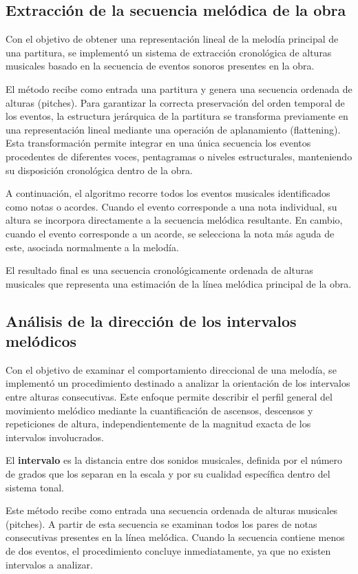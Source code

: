 \subsection{Extracción de la secuencia melódica de la obra}
Con el objetivo de obtener una representación lineal de la melodía principal de una partitura, se implementó un sistema de extracción cronológica de alturas musicales basado en la secuencia de eventos sonoros presentes en la obra.

El método recibe como entrada una partitura y genera una secuencia ordenada de alturas (pitches). Para garantizar la correcta preservación del orden temporal de los eventos, la estructura jerárquica de la partitura se transforma previamente en una representación lineal mediante una operación de aplanamiento (flattening). Esta transformación permite integrar en una única secuencia los eventos procedentes de diferentes voces, pentagramas o niveles estructurales, manteniendo su disposición cronológica dentro de la obra.

A continuación, el algoritmo recorre todos los eventos musicales identificados como notas o acordes. Cuando el evento corresponde a una nota individual, su altura se incorpora directamente a la secuencia melódica resultante. En cambio, cuando el evento corresponde a un acorde, se selecciona la nota más aguda de este, asociada normalmente a la melodía.

El resultado final es una secuencia cronológicamente ordenada de alturas musicales que representa una estimación de la línea melódica principal de la obra.

\subsection{Análisis de la dirección de los intervalos melódicos}
Con el objetivo de examinar el comportamiento direccional de una melodía, se implementó un procedimiento destinado a analizar la orientación de los intervalos entre alturas consecutivas. Este enfoque permite describir el perfil general del movimiento melódico mediante la cuantificación de ascensos, descensos y repeticiones de altura, independientemente de la magnitud exacta de los intervalos involucrados.

El \textbf{intervalo} \citep{grove1900dictionary} es la distancia entre dos sonidos musicales, definida por el número de grados que los separan en la escala y por su cualidad específica dentro del sistema tonal.

Este método recibe como entrada una secuencia ordenada de alturas musicales (pitches). A partir de esta secuencia se examinan todos los pares de notas consecutivas presentes en la línea melódica. Cuando la secuencia contiene menos de dos eventos, el procedimiento concluye inmediatamente, ya que no existen intervalos a analizar.


